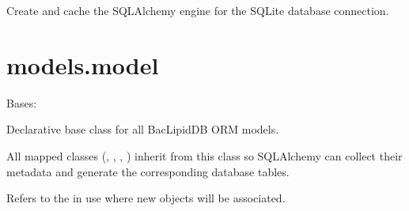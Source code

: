 \documentclass[letterpaper,10pt,english]{sphinxmanual}
\begin{document}
\begin{fulllineitems}
\label{\detokenize{api:config.get_engine}}
\pysigstartsignatures
\pysiglinewithargsret
{}
{}
{}
\pysigstopsignatures
\sphinxAtStartPar
Create and cache the SQLAlchemy engine for the SQLite database connection.

\end{fulllineitems}



\section{models.model}
\label{\detokenize{api:module-models.model}}\label{\detokenize{api:models-model}}

\begin{fulllineitems}
\label{\detokenize{api:models.model.Base}}
\pysigstartsignatures
\pysiglinewithargsret
{}
{}
{}
\pysigstopsignatures
\sphinxAtStartPar
Bases: 

\sphinxAtStartPar
Declarative base class for all BacLipidDB ORM models.

\sphinxAtStartPar
All mapped classes ({\hyperref[\detokenize{api:models.model.Detection}]{}}, {\hyperref[\detokenize{api:models.model.Fragment}]{}}, {\hyperref[\detokenize{api:models.model.Lipid}]{}},
{\hyperref[\detokenize{api:models.model.Annotation}]{}}) inherit from this class so SQLAlchemy can collect
their metadata and generate the corresponding database tables.

\begin{fulllineitems}
\label{\detokenize{api:models.model.Base.registry}}
\pysigstartsignatures
\pysigline
{}
\pysigstopsignatures
\sphinxAtStartPar
Refers to the  in use where new
 objects will be associated.

\end{fulllineitems}


\end{fulllineitems}
\end{document}
